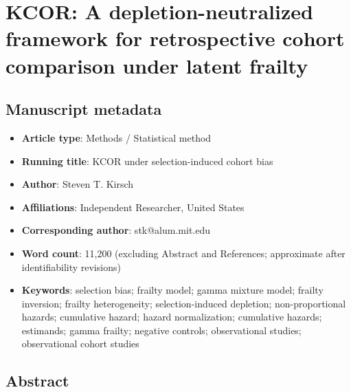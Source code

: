 \documentclass[
]{article}
\author{}
\date{}
\providecommand{\tightlist}{%
  \setlength{\itemsep}{0pt}\setlength{\parskip}{0pt}}
\begin{document}
\section{KCOR: A depletion-neutralized framework for retrospective cohort comparison under latent frailty}\label{kcor-a-depletion-neutralized-framework-for-retrospective-cohort-comparison-under-latent-frailty}

\subsection{Manuscript metadata}\label{manuscript-metadata}

\begin{itemize}
\tightlist
\item
  \textbf{Article type}: Methods / Statistical method
\item
  \textbf{Running title}: KCOR under selection-induced cohort bias
\item
  \textbf{Author}: Steven T. Kirsch
\item
  \textbf{Affiliations}: Independent Researcher, United States
\item
  \textbf{Corresponding author}: stk@alum.mit.edu
\item
  \textbf{Word count}: 11,200 (excluding Abstract and References; approximate after identifiability revisions)
\item
  \textbf{Keywords}: selection bias; frailty model; gamma mixture model; frailty inversion; frailty heterogeneity; selection-induced depletion; non-proportional hazards; cumulative hazard; hazard normalization; cumulative hazards; estimands; gamma frailty; negative controls; observational studies; observational cohort studies
\end{itemize}

\subsection{Abstract}\label{abstract}
\end{document}
